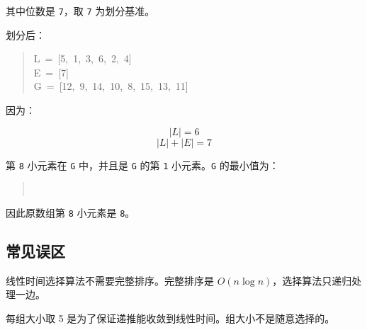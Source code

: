 \documentclass[UTF8,zihao=-4]{ctexart}
\begin{document}
其中位数是 \texttt{7}，取 \texttt{7} 为划分基准。

划分后：

\begin{quote}
\small\ttfamily\raggedright
\relax L\ =\ [5,\ 1,\ 3,\ 6,\ 2,\ 4]\\
\relax E\ =\ [7]\\
\relax G\ =\ [12,\ 9,\ 14,\ 10,\ 8,\ 15,\ 13,\ 11]\\
\end{quote}

因为：

\[|L| = 6\]
\[|L| + |E| = 7\]

第 \texttt{8} 小元素在 \texttt{G} 中，并且是 \texttt{G} 的第 \texttt{1} 小元素。\texttt{G} 的最小值为：

\begin{quote}
\small\ttfamily\raggedright
{}\\
\end{quote}

因此原数组第 \texttt{8} 小元素是 \texttt{8}。

\subsection*{常见误区}

线性时间选择算法不需要完整排序。完整排序是 $O(n \log n)$，选择算法只递归处理一边。

每组大小取 5 是为了保证递推能收敛到线性时间。组大小不是随意选择的。
\end{document}
